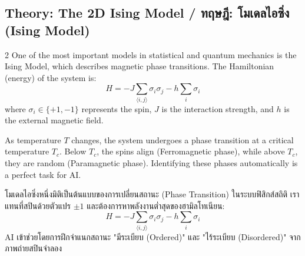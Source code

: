 \subsection{Theory: The 2D Ising Model \quad / \quad \textthai{ทฤษฎี: โมเดลไอซิ่ง (Ising Model)}}
\begin{paracol}{2}
One of the most important models in statistical and quantum mechanics is the Ising Model, which describes magnetic phase transitions. The Hamiltonian (energy) of the system is:
\begin{equation}
    H = -J \sum_{\langle i,j \rangle} \sigma_i \sigma_j - h \sum_i \sigma_i
\end{equation}
where $\sigma_i \in \{+1, -1\}$ represents the spin, $J$ is the interaction strength, and $h$ is the external magnetic field. 

As temperature $T$ changes, the system undergoes a phase transition at a critical temperature $T_c$. Below $T_c$, the spins align (Ferromagnetic phase), while above $T_c$, they are random (Paramagnetic phase). Identifying these phases automatically is a perfect task for AI.

\switchcolumn

\begin{thai}
โมเดลไอซิ่งหนึ่งมิติเป็นต้นแบบของการเปลี่ยนสถานะ (Phase Transition) ในระบบฟิสิกส์สถิติ เราแทนที่สปินด้วยตัวแปร $\pm 1$ และต้องการหาพลังงานต่ำสุดของฮามิลโทเนียน:
\begin{equation}
    H = -J \sum_{\langle i,j \rangle} \sigma_i \sigma_j - h \sum_i \sigma_i
\end{equation}
AI เข้าช่วยโดยการฝึกจำแนกสถานะ "มีระเบียบ (Ordered)" และ "ไร้ระเบียบ (Disordered)" จากภาพถ่ายสปินจำลอง
\end{thai}
\end{paracol}

